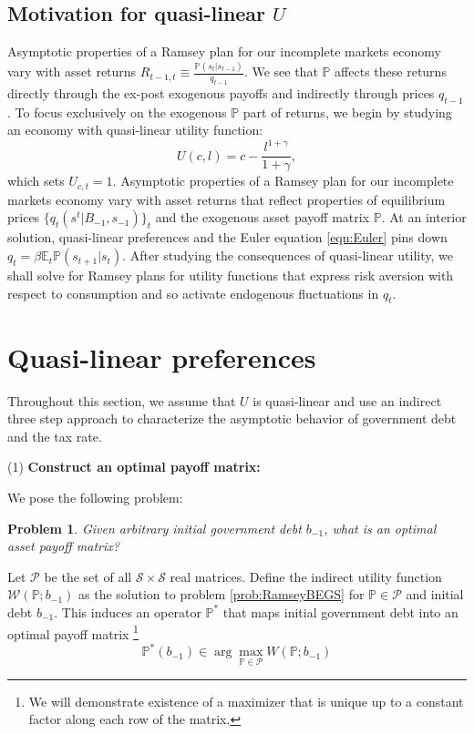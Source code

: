 \documentclass[12pt]{article}
\newtheorem{problem}[theorem]{Problem}
\begin{document}
\subsection{Motivation for  quasi-linear $U$\label{sec:excusequasilinear}}
Asymptotic properties of a Ramsey plan for our incomplete markets economy vary  with asset returns $R_{t-1,t}\equiv \frac{\mathbb{P}(s_{t}|s_{t-1})}{q_{t-1}}$. We see that $\mathbb{P}$ affects these returns directly through the ex-post exogenous payoffs and indirectly through prices $q_{t-1}$. To focus exclusively on the exogenous $\mathbb{P}$ part of returns, we begin  by studying an economy with  quasi-linear  utility function:
  \begin{equation}\label{eqn:UQL}
U(c,l)=c-\frac{l^{1+\gamma}}{1+\gamma},\end{equation} which sets $U_{c,t}= 1$.  Asymptotic properties of a Ramsey plan for our incomplete markets economy vary  with   asset returns that reflect
	properties of equilibrium prices $\{q_t(s^t|B_{-1},s_{-1})\}_t$ and the exogenous asset payoff matrix $\mathbb{P}$.
At an interior solution, quasi-linear preferences and the Euler equation \eqref{eqn:Euler} pins down $q_t=\beta \mathbb{E}_t
\mathbb{P}(s_{t+1}|s_t)$.  After studying the consequences of quasi-linear utility, we shall solve for Ramsey plans for utility functions that express risk aversion with respect to consumption and so activate endogenous fluctuations in $q_t$.



\section{Quasi-linear preferences}

Throughout this section, we assume that $U$ is quasi-linear and use an indirect three step approach to  characterize  the asymptotic behavior of government  debt and the tax rate.



\noindent (1) \textbf{Construct  an optimal payoff matrix:}

We pose the following problem:
\begin{problem}\label{prob:PPoperator}
 Given arbitrary initial government debt $b_{-1}$, what is an optimal asset payoff matrix?
\end{problem}
\noindent  Let $\mathcal P$ be the set of all $\mathcal S\times \mathcal S$ real matrices.  Define the indirect utility function $\mathcal W(\mathbb P;b_{-1})$ as the solution to problem \ref{prob:RamseyBEGS} for $\mathbb P \in \mathcal P$ and initial debt $b_{-1}$.  This induces an operator $\mathbb P^*$ that maps initial government debt into an optimal payoff matrix \footnote{We will demonstrate existence of a maximizer that is unique up to a constant factor along each row of the matrix.}
\[
	\mathbb P^*(b_{-1}) \in \arg\max_{\mathbb P\in \mathcal P} W(\mathbb P; b_{-1})
\]
\end{document}
